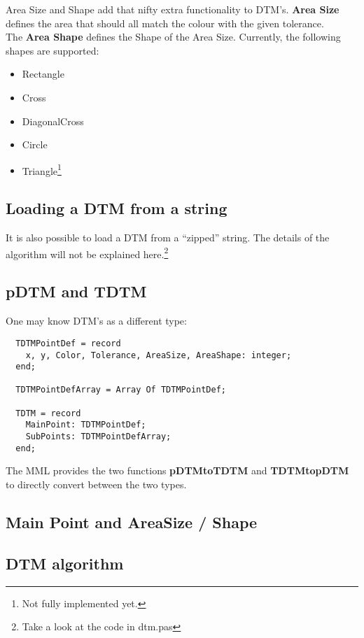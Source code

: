 \documentclass[a4paper, 10pt]{report} %
\begin{document}
Area Size and Shape add that nifty extra functionality to DTM's.
\textbf{Area Size} defines the area that should all match the colour with the given
tolerance. \\

The \textbf{Area Shape} defines the Shape of the Area Size.
Currently, the following shapes are supported:
\begin{itemize}
	\item Rectangle
	\item Cross
	\item DiagonalCross
	\item Circle
	\item Triangle\footnote{Not fully implemented yet.}
\end{itemize}

\subsection{Loading a DTM from a string}

It is also possible to load a DTM from a ``zipped'' string.
The details of the algorithm will not be explained here.\footnote{Take
a look at the code in dtm.pas}

\subsection{pDTM and TDTM}

One may know DTM's as a different type:

\begin{verbatim}
  TDTMPointDef = record
    x, y, Color, Tolerance, AreaSize, AreaShape: integer;
  end;

  TDTMPointDefArray = Array Of TDTMPointDef;

  TDTM = record
    MainPoint: TDTMPointDef;
    SubPoints: TDTMPointDefArray;
  end;    
\end{verbatim}

The MML provides the two functions \textbf{pDTMtoTDTM} and \textbf{TDTMtopDTM} to
directly convert between the two types.

\subsection{Main Point and AreaSize / Shape}

\subsection{DTM algorithm}
\end{document}
